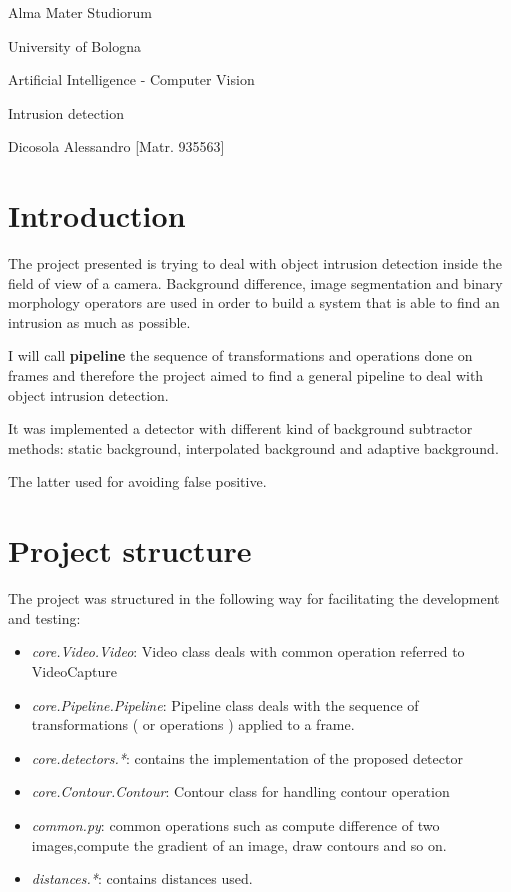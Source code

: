 \documentclass{article}
\begin{document}
\begin{titlepage}
    \vspace*{1cm}

    \begin{center}
        \Huge{Alma Mater Studiorum

            University of Bologna }
    \end{center}

    \vspace*{5 cm}
    \begin{center}
        \LARGE{Artificial Intelligence - Computer Vision}

        \Large Intrusion detection

        \large {Dicosola Alessandro [Matr. 935563]}
    \end{center}
\end{titlepage}

\section{Introduction}
The project presented is trying to deal with object intrusion detection inside the field of view of a camera.
Background difference, image segmentation and binary morphology operators are used in order to build a system that is able to find an intrusion as much as possible.

I will call \textbf{pipeline} the sequence of transformations and operations done on frames and therefore the project aimed to find a general pipeline to deal with object intrusion detection.

It was implemented a detector with different kind of background subtractor methods: static background, interpolated background and adaptive background.

The latter used for avoiding false positive.

\section{Project structure}
The project was structured in the following way for facilitating the development and testing:
\begin{itemize}
    \item \textit{core.Video.Video}: Video class deals with common operation referred to VideoCapture
    \item \textit{core.Pipeline.Pipeline}: Pipeline class deals with the sequence of transformations ( or operations ) applied to a frame.
    \item \textit{core.detectors.*}: contains the implementation of the proposed detector
    \item \textit{core.Contour.Contour}: Contour class for handling contour operation
    \item \textit{common.py}: common operations such as compute difference of two images,compute the gradient of an image, draw contours and so on.
    \item \textit{distances.*}: contains distances used.
\end{itemize}
\end{document}
